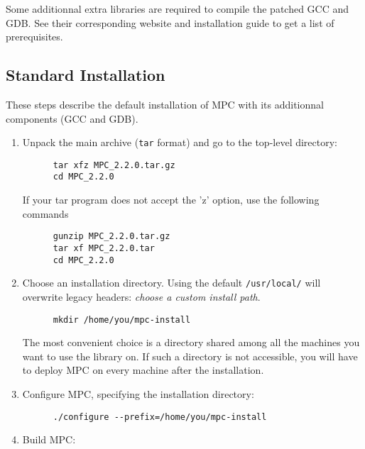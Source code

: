 \documentclass[a4paper,11pt]{article}
\begin{document}
Some additionnal extra libraries are required to compile the patched GCC and GDB.
See their corresponding website and installation guide to get a list of prerequisites.


\subsection{Standard Installation}

These steps describe the default installation of MPC with its additionnal components (GCC and GDB).

\begin{enumerate}
\item  Unpack the main archive (\texttt{tar} format) and go to the top-level directory:
\begin{verbatim}
      tar xfz MPC_2.2.0.tar.gz
      cd MPC_2.2.0
\end{verbatim}

    If your tar program does not accept the 'z' option, use the following commands

\begin{verbatim}
      gunzip MPC_2.2.0.tar.gz
      tar xf MPC_2.2.0.tar
      cd MPC_2.2.0
\end{verbatim}

\item  Choose an installation directory. Using the default \texttt{/usr/local/}
will overwrite legacy headers: \emph{choose a custom install path}.

\begin{verbatim}
      mkdir /home/you/mpc-install
\end{verbatim}

    The most convenient choice is a directory shared among all the machines you
    want to use the library on.  If such a directory is not accessible, you will
    have to deploy MPC on every machine after the installation.

\item  Configure MPC, specifying the installation directory:

\begin{verbatim}
      ./configure --prefix=/home/you/mpc-install
\end{verbatim}

\item  Build MPC:


\end{enumerate}
\end{document}
